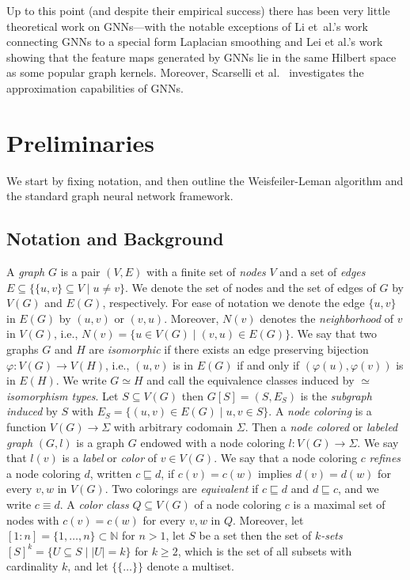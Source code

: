 \documentclass[letterpaper]{article}
\theoremstyle{definition}
\newcommand{\new}[1]{\emph{#1}}
\newcommand{\NN}{\mathbb{N}}
\newcommand{\oms}{\{\!\!\{}
\newcommand{\cms}{\}\!\!\}}
\begin{document}
Up to this point (and despite their empirical success) there has been very little theoretical work on GNNs---with the notable exceptions of Li et\ al.'s \cite{Li+2018a} work connecting GNNs to a special form Laplacian smoothing and Lei et al.'s\@ \cite{Lei+2017} work showing that the feature maps generated by GNNs lie in the same Hilbert space as some popular graph kernels. Moreover, Scarselli et al.\ \cite{Sca+2009a} investigates the approximation capabilities of GNNs. 

\section{Preliminaries}\label{prelim}

We start by fixing notation, and then outline the Weisfeiler-Leman algorithm and the standard graph neural network framework.  

\subsection{Notation and Background}
A \new{graph} $G$ is a pair $(V,E)$ with a finite set of \new{nodes} $V$ and a set of \new{edges} $E \subseteq \{ \{u,v\} \subseteq V \mid u \neq v \}$. We denote the set of nodes and the set of edges of $G$ by $V(G)$ and $E(G)$, respectively. For ease of notation we denote the edge $\{u,v\}$ in $E(G)$ by $(u,v)$ or $(v,u)$.
Moreover, $N(v)$ denotes the \new{neighborhood} of $v$ in $V(G)$, i.e., $N(v) = \{ u \in V(G) \mid (v, u) \in E(G) \}$. We say that two graphs $G$ and $H$ are \new{isomorphic} if there exists an edge preserving bijection $\varphi: V(G) \to V(H)$, i.e., $(u,v)$ is in $E(G)$ if and only if $(\varphi(u),\varphi(v))$ is in $E(H)$. We write $G \simeq H$ and call the equivalence classes induced by $\simeq$ \new{isomorphism types}. Let $S \subseteq V(G)$ then $G[S] = (S,E_S)$ is the \new{subgraph induced} by $S$ with $E_S = \{ (u,v) \in E(G) \mid u,v \in S \}$. A \new{node coloring} is a function $V(G) \to \Sigma$ with arbitrary codomain $\Sigma$. Then a  \new{node colored} or \new{labeled graph}  $(G,l)$ is a graph $G$ endowed with a node coloring $l \colon V(G) \to \Sigma$. We say that $l(v)$ is a \new{label} or \new{color} of $v\in V(G)$. We say that a node coloring $c$ \new{refines} a node coloring $d$, written $c \sqsubseteq d$, if $c(v) = c(w)$ implies $d(v) = d(w)$ for every $v,w$ in $V(G)$. 
Two colorings are \new{equivalent} if $c \sqsubseteq d$ and $d \sqsubseteq c$, and we write $c \equiv d$.
A \new{color class} $Q\subseteq V(G)$ of a node coloring $c$ is a maximal set of nodes with $c(v)=c(w)$ for every $v,w$ in $Q$. Moreover, let $[1\!:\!n] = \{ 1, \dotsc, n \} \subset \NN$ for $n > 1$, let $S$ be a set then the set of \new{$k$-sets} $[S]^k = \{ U \subseteq S \mid |U| = k \}$  for $k \geq 2$, which is the set of all subsets with cardinality $k$, and let $\oms \dots \cms$ denote a multiset.
\end{document}
